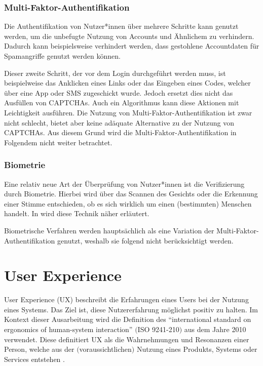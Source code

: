 \subsubsection*{Multi-Faktor-Authentifikation}
Die Authentifikation von Nutzer*innen über mehrere Schritte kann genutzt werden, um die unbefugte Nutzung von Accounts und Ähnlichem zu verhindern.
Dadurch kann beispielsweise verhindert werden, dass gestohlene Accountdaten für Spamangriffe genutzt werden können.

Dieser zweite Schritt, der vor dem Login durchgeführt werden muss, ist beispielweise das Anklicken eines Links oder das Eingeben eines Codes,
welcher über eine App oder SMS zugeschickt wurde.
Jedoch ersetzt dies nicht das Ausfüllen von CAPTCHAs.
Auch ein Algorithmus kann diese Aktionen mit Leichtigkeit ausführen. 
Die Nutzung von Multi-Faktor-Authentifikation ist zwar nicht schlecht,
bietet aber keine adäquate Alternative zu der Nutzung von CAPTCHAs. 
Aus diesem Grund wird die Multi-Faktor-Authentifi\-kation in Folgendem nicht weiter betrachtet.

\subsubsection*{Biometrie}
Eine relativ neue Art der Überprüfung von Nutzer*innen ist die Verifizierung durch Biometrie.
Hierbei wird über das Scannen des Gesichts oder die Erkennung einer Stimme entschieden, ob es sich wirklich um einen (bestimmten) Menschen handelt.
In \cite{rtcaptcha} wird diese Technik näher erläutert. 

Biometrische Verfahren werden hauptsächlich als eine Variation der Multi-Faktor-Authentifikation genutzt,
weshalb sie folgend nicht berücksichtigt werden. 

\section{User Experience}

User Experience (UX) beschreibt die Erfahrungen eines Users bei der Nutzung eines Systems. 
Das Ziel ist, diese Nutzererfahrung möglichst positiv zu halten. 
Im Kontext dieser Ausarbeitung wird die Definition des  ``international standard on ergonomics of human-system interaction'' $($ISO 9241-210$)$
aus dem Jahre 2010 verwendet. 
Diese definitiert UX als die Wahrnehmungen und Resonanzen einer Person, 
welche aus der $($voraussichtlichen$)$ Nutzung eines Produkts, Systems oder Services entstehen \cite[p.1629]{berni_borgianni_2021}.

